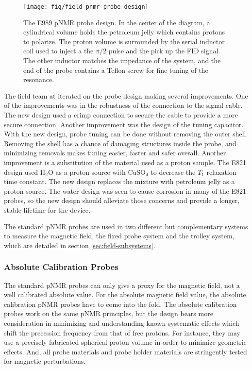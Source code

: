 \begin{figure}
\centering
\texttt{[image: fig/field-pnmr-probe-design]}
\caption{
    The E989 pNMR probe design.  In the center of the diagram, a cylindrical volume holds the petroleum jelly which contains protons to polarize.  The proton volume is surrounded by the serial inductor coil used to inject a the $\pi/2$ pulse and the pick up the FID signal.  The other inductor matches the impedance of the system, and the end of the probe contains a Teflon screw for fine tuning of the resonance.
    \label{fig:field-pnmr-probe-design}
}
\end{figure}

The field team at \uw iterated on the probe design making several improvements.  One of the improvements was in the robustness of the connection to the signal cable.  The new design used a crimp connection to secure the cable to provide a more secure connection.  Another improvement was the design of the tuning capacitor.  With the new design, probe tuning can be done without removing the outer shell.  Removing the shell has a chance of damaging structures inside the probe, and minimizing removals makes tuning easier, faster and safer overall.  Another improvement is a substitution of the material used as a proton sample.  The E821 design used $\mathrm{H_2O}$ as a proton source with $\mathrm{CuSO_4}$ to decrease the $T_1$ relaxation time constant.  The new design replaces the mixture with petroleum jelly as a proton source.  The water design was seen to cause corrosion in many of the E821 probes, so the new design should alleviate those concerns and provide a longer, stable lifetime for the device.

The standard pNMR probes are used in two different but complementary systems to measure the magnetic field, the fixed probe system and the trolley system, which are detailed in section \ref{sec:field-subsystems}.

\subsubsection{Absolute Calibration Probes}

The standard pNMR probes can only give a proxy for the magnetic field, not a well calibrated absolute value.  For the absolute magnetic field value, the absolute calibration pNMR probes have to come into the fold.  The absolute calibration probes work on the same pNMR principles, but the design bears more consideration in minimizing and understanding known systematic effects which shift the precession frequency from that of free protons.  For instance, they may use a precisely fabricated spherical proton volume in order to minimize geometric effects.  And, all probe materials and probe holder materials are stringently tested for magnetic perturbations.

